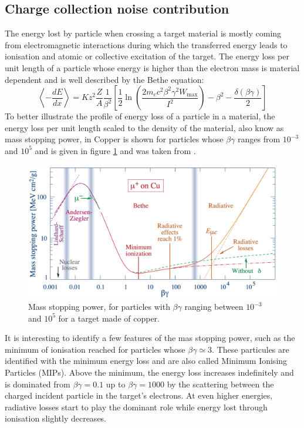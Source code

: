 	 	\subsection{Charge collection noise contribution}
	 	The energy lost by particle when crossing a target material is mostly coming from electromagnetic interactions during which the transferred energy leads to ionisation and atomic or collective excitation of the target. The energy loss per unit length of a particle whose energy is higher than the electron mass is material dependent and is well described by the Bethe equation: 
	 	\begin{equation}
	 		\left\langle -\frac{dE}{dx} \right\rangle = K z^2 \frac{Z}{A} \frac{1}{\beta^2} \left[ \frac{1}{2} \ln\left( \frac{2 m_e c^2 \beta^2 \gamma^2 W_{\text{max}}}{I^2} \right) - \beta^2 - \frac{\delta(\beta \gamma)}{2} \right]
	 	\end{equation}
	 	To better illustrate the profile of energy loss of a particle in a material, the energy loss per unit length scaled to the density of the material, also know as mass stopping power, in Copper is shown for particles whose $\beta \gamma$ ranges from $10^{-3}$ and $10^5$ and is given in figure \ref{im:bethe_bloch} and was taken from \cite{PDG}.
	 	\begin{figure}[h]
			\centering
			\includegraphics[width=0.85\linewidth]{files/bethe_bloch}
			\caption{Mass stopping power, for particles with $\beta \gamma$ ranging between $10^{-3}$ and $10^5$ for a target made of copper.}
			\label{im:bethe_bloch}
		\end{figure} 
		
		It is interesting to identify a few features of the mas stopping power, such as the minimum of ionisation reached for particles whose $\beta \gamma \simeq 3$. These particules are identified with the minimum energy loss and are also called Minimum Ionising Particles (MIPs). Above the minimum, the energy loss increases indefinitely and is dominated from $\beta\gamma = 0.1$ up to $\beta \gamma =1000$ by the scattering between the charged incident particle in the target's electrons. At even higher energies, radiative losses start to play the dominant role while energy lost through ionisation slightly decreases.  
	
